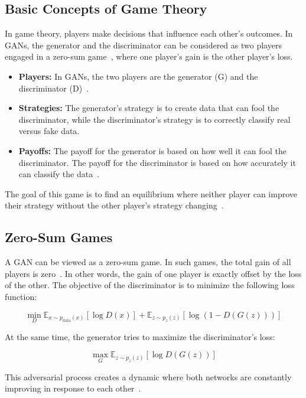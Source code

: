 \subsection{Basic Concepts of Game Theory}
In game theory, players make decisions that influence each other's outcomes. In GANs, the generator and the discriminator can be considered as two players engaged in a zero-sum game~\cite{friedman1998work}, where one player's gain is the other player's loss.

\begin{itemize}
    \item \textbf{Players:} In GANs, the two players are the generator (G) and the discriminator (D)~\cite{goodfellow2014generative, kazeminia2020gans}.
    \item \textbf{Strategies:} The generator's strategy is to create data that can fool the discriminator, while the discriminator's strategy is to correctly classify real versus fake data.
    \item \textbf{Payoffs:} The payoff for the generator is based on how well it can fool the discriminator. The payoff for the discriminator is based on how accurately it can classify the data~\cite{goodfellow2014generative}.
\end{itemize}

The goal of this game is to find an equilibrium where neither player can improve their strategy without the other player's strategy changing~\cite{fudenberg1991game}.

\subsection{Zero-Sum Games}
A GAN can be viewed as a zero-sum game. In such games, the total gain of all players is zero~\cite{friedman1998work}. In other words, the gain of one player is exactly offset by the loss of the other. The objective of the discriminator is to minimize the following loss function:

\[
\min_D \mathbb{E}_{x \sim p_{\text{data}}(x)}[\log D(x)] + \mathbb{E}_{z \sim p_z(z)}[\log (1 - D(G(z)))]
\]

At the same time, the generator tries to maximize the discriminator's loss:

\[
\max_G \mathbb{E}_{z \sim p_z(z)}[\log D(G(z))]
\]

This adversarial process creates a dynamic where both networks are constantly improving in response to each other~\cite{farnia2020gans}.

